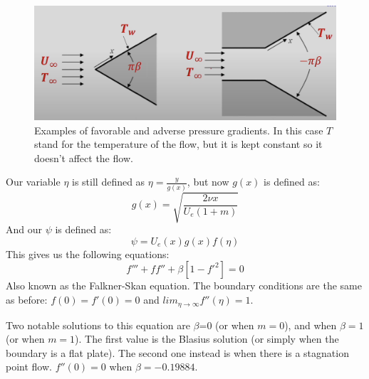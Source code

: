 \documentclass{article}
\begin{document}
\begin{figure}
    \centering
    \includegraphics[width=\textwidth]{Wedges Examples.png}
    \caption{Examples of favorable and adverse pressure gradients. In this case $T$ stand for the temperature of the flow, but it is kept constant so it doesn't affect the flow.}
    \label{fig:Wedges Examples}
\end{figure}

Our variable $\eta$ is still defined as $\eta=\frac{y}{g(x)}$, but now $g(x)$ is defined as:
\begin{equation}
    g(x)=\sqrt{\frac{2\nu x}{U_e(1+m)}}
\end{equation}
And our $\psi$ is defined as:
\begin{equation}
    \psi=U_e(x)g(x)f(\eta)
\end{equation}
This gives us the following equations:
\begin{equation}
    f'''+ff''+\beta [1-f'^2]=0
\end{equation}
Also known as the Falkner-Skan equation. The boundary conditions are the same as before: $f(0)=f'(0)=0$ and $lim_{\eta \to \infty} f''(\eta)=1$.

Two notable solutions to this equation are $\beta$=0 (or when $m=0$), and when $\beta=1$ (or when $m=1$). The first value is the Blasius solution (or simply when the boundary is a flat plate). The second one instead is when there is a stagnation point flow. $f''(0)=0$ when $\beta=-0.19884$. \\
\end{document}
